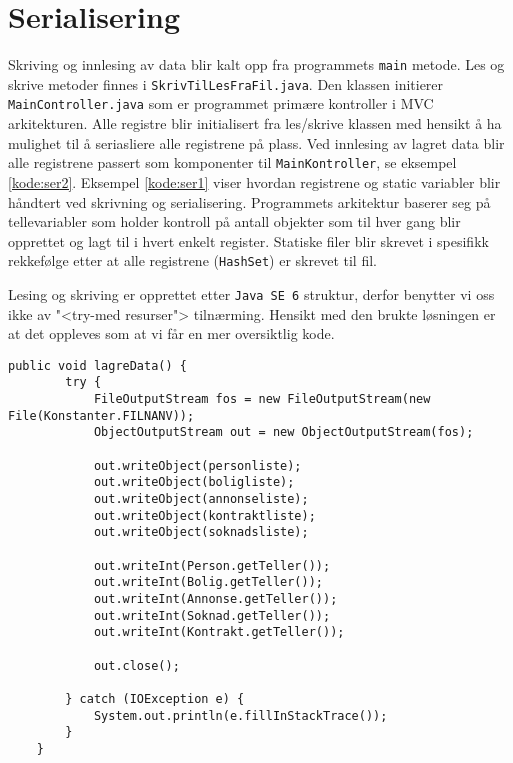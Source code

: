 \section{Serialisering} \label{sec:serialisering}
Skriving og innlesing av data blir kalt opp fra programmets \texttt{main} metode. Les og skrive metoder finnes i \texttt{SkrivTilLesFraFil.java}. Den klassen initierer \texttt{MainController.java} som er programmet primære kontroller i MVC arkitekturen. Alle registre blir initialisert fra les/skrive klassen med hensikt å ha mulighet til å seriasliere alle registrene på plass. Ved innlesing av lagret data blir alle registrene passert som komponenter til \texttt{MainKontroller}, se eksempel \ref{kode:ser2}. Eksempel \ref{kode:ser1} viser hvordan registrene og static variabler blir håndtert ved skrivning og serialisering. Programmets arkitektur baserer seg på tellevariabler som holder kontroll på antall objekter som til hver gang blir opprettet og lagt til i hvert enkelt register. Statiske filer blir skrevet i spesifikk rekkefølge etter at alle registrene (\texttt{HashSet}) er skrevet til fil.

Lesing og skriving er opprettet etter \texttt{Java SE 6} struktur, derfor benytter vi oss ikke av  "<try-med resurser"> tilnærming. Hensikt med den brukte løsningen er at det oppleves som at vi får en mer oversiktlig kode.


\begin{lstlisting}[caption=Serialisering og skriving av data.,label=kode:ser1]
    public void lagreData() {
        try {
            FileOutputStream fos = new FileOutputStream(new File(Konstanter.FILNANV));
            ObjectOutputStream out = new ObjectOutputStream(fos);

            out.writeObject(personliste);
            out.writeObject(boligliste);
            out.writeObject(annonseliste);
            out.writeObject(kontraktliste);
            out.writeObject(soknadsliste);

            out.writeInt(Person.getTeller());
            out.writeInt(Bolig.getTeller());
            out.writeInt(Annonse.getTeller());
            out.writeInt(Soknad.getTeller());
            out.writeInt(Kontrakt.getTeller());

            out.close();

        } catch (IOException e) {
            System.out.println(e.fillInStackTrace());
        }
    }
\end{lstlisting}

